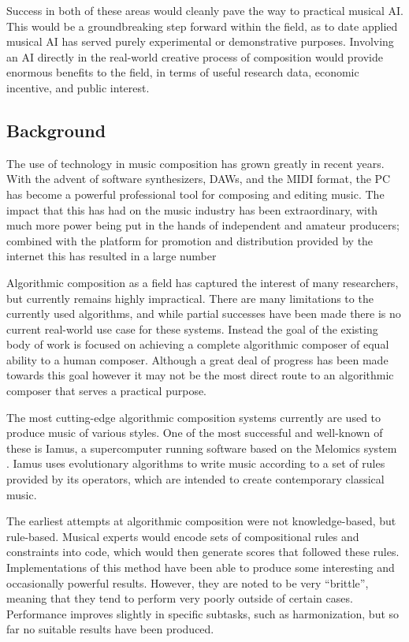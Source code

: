 \documentclass[11pt]{article}
\begin{document}
	Success in both of these areas would cleanly pave the way to practical musical AI. This would be a groundbreaking step forward within the field, as to date applied musical AI has served purely experimental or demonstrative purposes. Involving an AI directly in the real-world creative process of composition would provide enormous benefits to the field, in terms of useful research data, economic incentive, and public interest.
	
	\subsection{Background}
	
	The use of technology in music composition has grown greatly in recent years. With the advent of software synthesizers, DAWs, and the MIDI format, the PC has become a powerful professional tool for composing and editing music. The impact that this has had on the music industry has been extraordinary, with much more power being put in the hands of independent and amateur producers; combined with the platform for promotion and distribution provided by the internet this has resulted in a large number 
	
	
	Algorithmic composition as a field has captured the interest of many researchers, but currently remains highly impractical. There are many limitations to the currently used algorithms, and while partial successes have been made %
	there is no current real-world use case for these systems. Instead the goal of the existing body of work is focused on achieving a complete algorithmic composer of equal ability to a human composer. Although a great deal of progress has been made towards this goal however it may not be the most direct route to an algorithmic composer that serves a practical purpose. 
	
	The most cutting-edge algorithmic composition systems currently are used to produce music of various styles. One of the most successful and well-known of these is Iamus, a supercomputer running software based on the Melomics system \cite{diaz2011composing}. Iamus uses evolutionary algorithms to write music according to a set of rules provided by its operators, which are intended to create contemporary classical music. 
	
	The earliest attempts at algorithmic composition were not knowledge-based, but rule-based. Musical experts would encode sets of compositional rules and constraints into code, which would then generate scores that followed these rules. Implementations of this method have been able to produce some interesting and occasionally powerful results. However, they are noted to be very ``brittle'', meaning that they tend to perform very poorly outside of certain cases. Performance improves slightly in specific subtasks, such as harmonization, but so far no suitable results have been produced.
	
\end{document}
